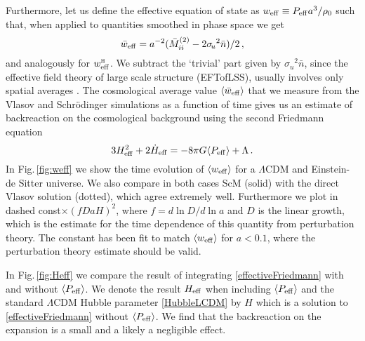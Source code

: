 \documentclass[twocolumn, nofootinbib, showpacs, superscriptaddress]{revtex4-1}
\renewcommand{\H}[0]{{\textsc{h}}}
\newcommand{\sigu}{{\sigma_{\! u}}}
\begin{document}
 Furthermore, let us define the effective equation of state as $w_{\rm eff} \equiv P_{\rm eff} a^3/\rho_0$ such that, when applied to quantities smoothed in phase space we get
\begin{equation} \label{weff}
\bar w_{\rm eff} = a^{-2} (\bar M^{(2)}_{ii} - 2 \sigu^2 \bar n) /2\,,
\end{equation}
and analogously for $w^\H_{\rm eff}$. We subtract the `trivial' part given by $\sigu^2 \bar n$, since the effective field theory of large scale structure (EFTofLSS), usually involves only spatial averages \cite{BaumannNicolisSenatoreEtal2012}.
The cosmological average value $\langle \bar w_{\rm eff} \rangle$ that we measure from the Vlasov and Schr\"odinger simulations as a function of time gives us an estimate of  backreaction on the cosmological background using the second Friedmann equation
\begin{equation} \label{effectiveFriedmann}
 3H_{\rm eff}^2 +2\dot H_{\rm eff} = - 8 \pi G \langle P_{\rm eff} \rangle+  \Lambda \,.
\end{equation}
In Fig.\,\ref{fig:weff} we show the time evolution of $\langle w_{\rm eff} \rangle$ for a $\Lambda$CDM and Einstein-de Sitter universe. We also compare 
in both cases ScM (solid) with the direct Vlasov solution (dotted), which agree extremely well. 
Furthermore we plot in dashed const$\times(fDaH)^2$, where $f=d\ln D/d \ln a $ and $D$ is the linear growth, which is the estimate for the time dependence of this quantity from perturbation theory. 
The constant has been fit to match $\langle w_{\rm eff} \rangle$ for $a<0.1$, where the perturbation theory estimate should be valid.

In Fig.\,\ref{fig:Heff} we compare the result of integrating \eqref{effectiveFriedmann} with and without $\langle P_{\rm eff} \rangle$. We denote the result $H_{\rm eff}$  when including $\langle P_{\rm eff} \rangle$ and the standard $\Lambda$CDM Hubble parameter \eqref{HubbleLCDM} by $H$ which is a solution to \eqref{effectiveFriedmann} without $\langle P_{\rm eff} \rangle$.
We find that the backreaction on the expansion is a small and a likely a negligible effect.
\end{document}
